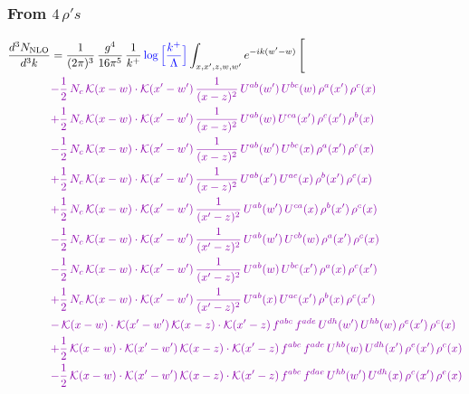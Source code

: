 \documentclass[10pt]{article}
\numberwithin{equation}{section}
\newcommand{\new}[1]{{\color{blue}#1}}
\begin{document}
\subsubsection*{From $4\, \rho's$}
\begin{align}
\frac{d^{3}N_{\mathrm{NLO}}}{d^{3}k} & = \frac{1}{(2\pi)^{3}}\,\frac{g^{4}}{16\pi^{5}}\,\frac{1}{k^{+}}\,\new{\log\Big[\frac{k^{+}}{\Lambda}\Big]}\int_{x,x',z,w,w'}e^{-ik(w'-w)}\,\Bigg[\notag\\ &{\color{CC} -\frac{1}{2}\,N_{c}\,\mathcal{K}(x-w)\cdot\mathcal{K}(x'-w')\,\frac{1}{(x-z)^{2}}\,U^{ab}(w')\,U^{bc}(w)\,\rho^{a}(x')\,\rho^{c}(x)} \notag\\
&{\color{CC} +\frac{1}{2}\,N_{c}\,\mathcal{K}(x-w)\cdot\mathcal{K}(x'-w')\,\frac{1}{(x-z)^{2}}\,U^{ab}(w)\,U^{ca}(x')\,\rho^{c}(x')\,\rho^{b}(x)} \notag\\
&{\color{CC} -\frac{1}{2}\,N_{c}\,\mathcal{K}(x-w)\cdot\mathcal{K}(x'-w')\,\frac{1}{(x-z)^{2}}\,U^{ab}(w')\,U^{bc}(x)\,\rho^{a}(x')\,\rho^{c}(x)} \notag\\
&{\color{CC} +\frac{1}{2}\,N_{c}\,\mathcal{K}(x-w)\cdot\mathcal{K}(x'-w')\,\frac{1}{(x-z)^{2}}\,U^{ab}(x')\,U^{ac}(x)\,\rho^{b}(x')\,\rho^{c}(x)} \notag\\
&{\color{CC} +\frac{1}{2}\,N_{c}\,\mathcal{K}(x-w)\cdot\mathcal{K}(x'-w')\,\frac{1}{(x'-z)^{2}}\,U^{ab}(w')\,U^{ca}(x)\,\rho^{b}(x')\,\rho^{c}(x)} \notag\\
&{\color{CC} -\frac{1}{2}\,N_{c}\,\mathcal{K}(x-w)\cdot\mathcal{K}(x'-w')\,\frac{1}{(x'-z)^{2}}\,U^{ab}(w')\,U^{cb}(w)\,\rho^{a}(x')\,\rho^{c}(x)} \notag\\
&{\color{CC} -\frac{1}{2}\,N_{c}\,\mathcal{K}(x-w)\cdot\mathcal{K}(x'-w')\,\frac{1}{(x'-z)^{2}}\,U^{ab}(w)\,U^{bc}(x')\,\rho^{a}(x)\,\rho^{c}(x')} \notag\\
&{\color{CC} +\frac{1}{2}\,N_{c}\,\mathcal{K}(x-w)\cdot\mathcal{K}(x'-w')\,\frac{1}{(x'-z)^{2}}\,U^{ab}(x)\,U^{ac}(x')\,\rho^{b}(x)\,\rho^{c}(x')} \notag\\
&{\color{CC} -\,\mathcal{K}(x-w)\cdot\mathcal{K}(x'-w')\,\mathcal{K}(x-z)\cdot\mathcal{K}(x'-z)\,f^{abc}\,f^{ade}\,U^{dh}(w')\,U^{hb}(w)\,\rho^{e}(x')\,\rho^{c}(x)} \notag\\
&{\color{CC} +\frac{1}{2}\,\mathcal{K}(x-w)\cdot\mathcal{K}(x'-w')\,\mathcal{K}(x-z)\cdot\mathcal{K}(x'-z)\,f^{abc}\,f^{ade}\,U^{hb}(w)\,U^{dh}(x')\,\rho^{e}(x')\,\rho^{c}(x)} \notag\\
&{\color{CC} -\frac{1}{2}\,\mathcal{K}(x-w)\cdot\mathcal{K}(x'-w')\,\mathcal{K}(x-z)\cdot\mathcal{K}(x'-z)\,f^{abc}\,f^{dae}\,U^{hb}(w')\,U^{dh}(x)\,\rho^{c}(x')\,\rho^{e}(x)} \notag\\

\end{align}
\end{document}
